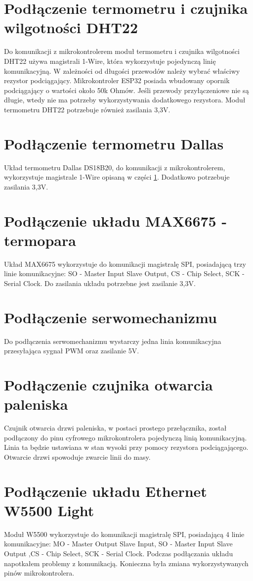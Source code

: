 \documentclass[11pt]{report}
\begin{document}
 \section{Podłączenie termometru i czujnika wilgotności DHT22}\label{dht}
 Do komunikacji z mikrokontrolerem moduł termometru i czujnika wilgotności DHT22  używa magistrali 1-Wire, która wykorzystuje pojedynczą linię komunikacyjną. W zależności od długości przewodów należy wybrać właściwy rezystor podciągający.  Mikrokontroler ESP32 posiada wbudowany opornik podciągający o wartości około 50k Ohmów. Jeśli przewody przyłączeniowe nie są długie, wtedy nie ma potrzeby wykorzystywania dodatkowego rezystora.
 Moduł termometru DHT22 potrzebuje również zasilania 3,3V.
 
 \section{Podłączenie termometru Dallas}
 Układ termometru Dallas DS18B20, do komunikacji z mikrokontrolerem, wykorzystuje magistrale 1-Wire opisaną w części \ref{dht}. Dodatkowo potrzebuje zasilania 3,3V.
 
 \section{Podłączenie układu MAX6675 - termopara}
 Układ MAX6675 wykorzystuje do komunikacji magistralę SPI, posiadającą trzy linie komunikacyjne: SO - Master Input Slave Output, CS - Chip Select, SCK - Serial Clock. Do zasilania układu potrzebne jest zasilanie 3,3V.
 
 \section{Podłączenie serwomechanizmu}
 Do podłączenia serwomechanizmu wystarczy jedna linia komunikacyjna przesyłająca sygnał PWM oraz zasilanie 5V.
 
 \section{Podłączenie czujnika otwarcia paleniska}
 Czujnik otwarcia drzwi paleniska, w postaci prostego przełącznika, został podłączony do pinu cyfrowego mikrokontrolera pojedynczą linią komunikacyjną. Linia ta będzie ustawiana w stan wysoki przy pomocy rezystora podciągającego. Otwarcie drzwi spowoduje zwarcie linii do masy. 
 
  \section{Podłączenie układu Ethernet W5500 Light}
 Moduł W5500 wykorzystuje do komunikacji magistralę SPI, posiadającą 4 linie komunikacyjne: MO - Master Output Slave Input, SO - Master Input Slave Output ,CS - Chip Select, SCK - Serial Clock.
 Podczas podłączania układu napotkałem problemy z komunikacją. Konieczna była zmiana wykorzystywanych pinów mikrokontrolera.
 
\end{document}
